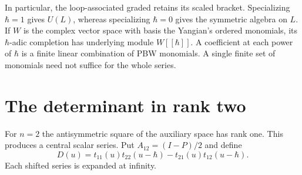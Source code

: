 In particular, the loop-associated graded retains its scaled bracket.
Specializing $\hbar=1$ gives $U(L)$, whereas specializing $\hbar=0$
gives the symmetric algebra on $L$.  If $W$ is the complex vector space
with basis the Yangian's ordered monomials, its $\hbar$-adic completion
has underlying module $W[[\hbar]]$.  A coefficient at each power of
$\hbar$ is a finite linear combination of PBW monomials.
A single finite set of monomials need not suffice for the whole series.

\section{The determinant in rank two}

For $n=2$ the antisymmetric square of the auxiliary space has rank one.
This produces a central scalar series.  Put
$A_{12}=(I-P)/2$ and define
\begin{equation}\label{cbc:rtt:determinant}
 D(u)=t_{11}(u)t_{22}(u-\hbar)
       -t_{21}(u)t_{12}(u-\hbar).
\end{equation}
Each shifted series is expanded at infinity.

